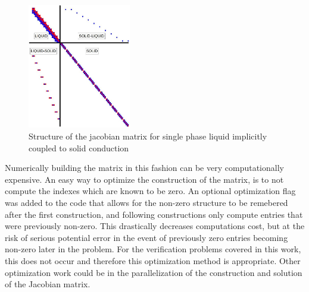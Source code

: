     \begin{figure}[!h]
    	\centering
    	\includegraphics[width=0.40\textwidth]{images/Implicit-Diagram.jpg}
    	\caption{Structure of the jacobian matrix for single phase liquid
    	implicitly coupled to solid conduction}
    	\label{fig:Implicit-Diagram}
    \end{figure}
    
    Numerically building the matrix in this fashion can be very computationally
    expensive. An easy way to optimize the construction of the matrix, is to not
    compute the indexes which are known to be zero. An optional optimization
    flag was added to the code that allows for the non-zero structure to be
    remebered after the first construction, and following constructions only
    compute entries that were previously non-zero. This drastically decreases
    computations cost, but at the risk of serious potential error in the event
    of previously zero entries becoming non-zero later in the problem. For the
    verification problems covered in this work, this does not occur and
    therefore this optimization method is appropriate. Other optimization work
    could be in the parallelization of the construction and solution of the
    Jacobian matrix. 
   
    
    
    
    






